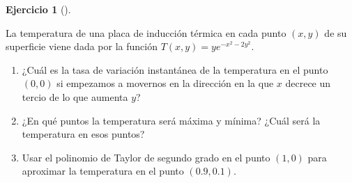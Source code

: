 \documentclass[
  a4paper,
]{scrreport}
\theoremstyle{definition}
\newtheorem{exercise}{Ejercicio}[chapter]
\theoremstyle{remark}
\begin{document}
\begin{exercise}[]\protect\hypertarget{exr-1}{}\label{exr-1}

La temperatura de una placa de inducción térmica en cada punto \((x,y)\)
de su superficie viene dada por la función \(T(x,y) = ye^{-x^2-2y^2}\).

\begin{enumerate}
\def\labelenumi{\alph{enumi}.}
\item
  ¿Cuál es la tasa de variación instantánea de la temperatura en el
  punto \((0,0)\) si empezamos a movernos en la dirección en la que
  \(x\) decrece un tercio de lo que aumenta \(y\)?
\item
  ¿En qué puntos la temperatura será máxima y mínima? ¿Cuál será la
  temperatura en esos puntos?
\item
  Usar el polinomio de Taylor de segundo grado en el punto \((1,0)\)
  para aproximar la temperatura en el punto \((0.9,0.1)\).
\end{enumerate}

\end{exercise}
\end{document}
